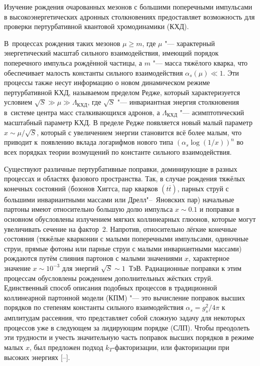 \newpage




Изучение рождения очарованных мезонов с большими поперечными импульсами в высокоэнергетических адронных столкновениях предоставляет возможность для проверки пертурбативной квантовой хромодинамики (КХД). 

В~процессах рождения таких мезонов $\mu\geq m$, где $\mu$ "--- характерный энергетический масштаб  сильного взаимодействия, имеющий порядок поперечного импульса рождённой частицы, а $m$ "--- масса тяжёлого кварка, что обеспечивает малость константы сильного взаимодействия $\alpha_{s}(\mu)\ll1$. Эти процессы также несут информацию о новом динамическом режиме пертурбативной КХД, называемом пределом Редже, который характеризуется условием $\sqrt{S}\gg\mu\gg\Lambda_{КХД}$, где $\sqrt{S}$ "--- инвариантная энергия столкновения в~системе центра масс сталкивающихся адронов, а $\Lambda_{КХД}$ "--- асимптотический масштабный параметр КХД. В пределе Редже появляется новый малый параметр $x\sim\mu/\sqrt{S}$, который с увеличением энергии становится всё более малым, что приводит к~появлению вклада логарифмов нового типа $(\alpha_s\log(1/x))^n$ во всех порядках теории возмущений по константе сильного взаимодействия.



Существуют различные пертурбативные поправки, доминирующие в разных процессах и областях фазового пространства. Так, в случае рождения тяжёлых конечных состояний (бозонов Хиггса, пар кварков $(t\overline{t})$, парных струй с большими инвариантными массами или Дрелл"--~Яновских пар) начальные партоны имеют относительно большую долю импульса $x\sim0.1$ и поправки в основном обусловлены излучением мягких коллинеарных глюонов, которые могут увеличивать сечение на фактор~2. Напротив,  относительно лёгкие конечные состояния (тяжёлые кварконии с малыми поперечными импульсами, одиночные струи, прямые фотоны или парные струи с малыми инвариантными массами) рождаются путём слияния партонов с малыми значениями $x$, характерное значение $x\sim10^{-3}$ для энергий $\sqrt{S}\sim1$~ТэВ. Радиационные поправки к этим процессам обусловлены рождением дополнительных жёстких струй. Единственный способ описания подобных процессов  в традиционной коллинеарной партонной модели (КПМ) "--- это вычисление поправок высших порядков по степеням константы сильного взаимодействия $\alpha_{s}=g_{s}^{2}/4\pi$ к амплитудам рассеяния, что представляет собой сложную задачу для некоторых процессов уже в следующем за лидирующим порядке (СЛП). Чтобы преодолеть эти трудности и учесть значительную часть поправок высших порядков в режиме малых $x$, был предложен подход $k_{T}$-факторизации, или факторизации при высоких энергиях [--].




